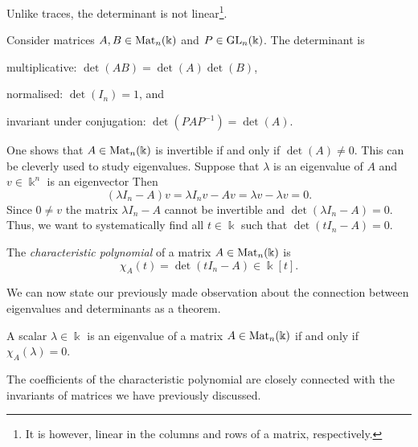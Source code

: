 \documentclass[a4paper, oneside, 12pt]{amsart}
\begin{document}
Unlike traces, the determinant is not linear\footnote{%
  It is however, linear in the columns and rows of a matrix, respectively.}.

\begin{proposition}\label{prop:basic-properties-of-determinant}
  Consider matrices \(A, B \in\operatorname{Mat}_{n}( \Bbbk) \) and \(P \in \operatorname{GL}_{n}( \Bbbk)\).
  The determinant is
  \begin{thmlist}
    \item multiplicative: \(\det(AB) = \det(A) \det (B)\),
    \item normalised: \(\det(I_{n}) = 1\), and
    \item invariant under conjugation: \(\det(PAP^{-1})= \det(A)\).
  \end{thmlist}
\end{proposition}

One shows that \(A\in \operatorname{Mat}_{n}( \Bbbk)\) is invertible if and only if \(\det(A) \neq 0\).
This can be cleverly used to study eigenvalues.
Suppose that \(\lambda\) is an eigenvalue of \(A\) and \(v \in \Bbbk^{n}\) is an eigenvector
Then
\begin{equation*}
  (\lambda I_{n} - A) v = \lambda I_{n} v - Av = \lambda v - \lambda v =0.
\end{equation*}
Since \(0 \neq v\) the matrix \(\lambda I_{n} - A\) cannot be invertible and \(\det (\lambda I_{n} - A) = 0\).
Thus, we want to systematically find all \(t \in \Bbbk\) such that  \(\det(t I_{n} - A) = 0\).

\begin{definition}\label{def:char-poly}
  The \emph{characteristic polynomial} of a matrix \( A \in \operatorname{Mat}_n(\Bbbk) \) is
  \begin{equation}
    \chi_A(t) = \det(t I_n - A) \in \Bbbk[t].
  \end{equation}
\end{definition}
We can now state our previously made observation about the connection between eigenvalues and determinants as a theorem.
\begin{theorem}\label{thm:eigenvalues-and-char-poly}
  A scalar \(\lambda \in \Bbbk\) is an eigenvalue of a matrix \(A\in \operatorname{Mat}_{n}( \Bbbk)\) if and only if \(\chi_{A}(\lambda) = 0\).
\end{theorem}

The coefficients of the characteristic polynomial are closely connected with the invariants of matrices we have previously discussed.
\end{document}
